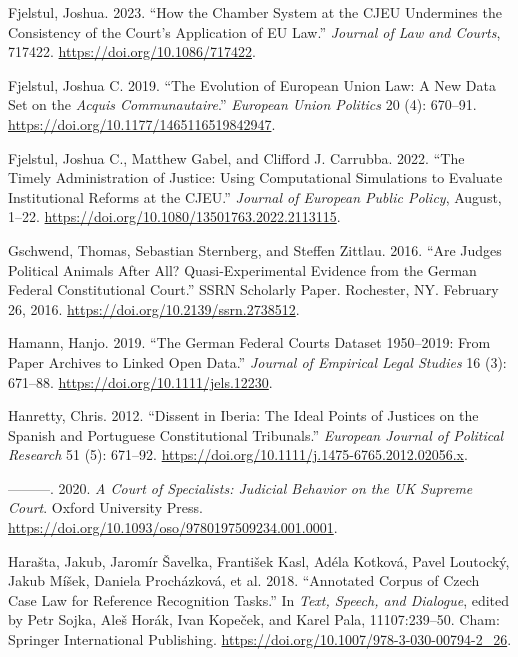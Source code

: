 \documentclass[
  11pt,
]{article}
\newlength{\cslhangindent}
\newenvironment{CSLReferences}[2] %
 {%
  \setlength{\parindent}{0pt}
  \ifodd #1 \everypar{\setlength{\hangindent}{\cslhangindent}}\ignorespaces\fi
  \ifnum #2 > 0
  \setlength{\parskip}{#2\baselineskip}
  \fi
 }%
 {}
\begin{document}
\begin{CSLReferences}{1}{0}
\leavevmode{}%
Fjelstul, Joshua. 2023. {``How the {Chamber System} at the {CJEU
Undermines} the {Consistency} of the {Court}'s {Application} of {EU
Law}.''} \emph{Journal of Law and Courts}, 717422.
\url{https://doi.org/10.1086/717422}.

\leavevmode{}%
Fjelstul, Joshua C. 2019. {``The Evolution of {European Union} Law: {A}
New Data Set on the {\emph{Acquis Communautaire}}.''} \emph{European
Union Politics} 20 (4): 670--91.
\url{https://doi.org/10.1177/1465116519842947}.

\leavevmode{}%
Fjelstul, Joshua C., Matthew Gabel, and Clifford J. Carrubba. 2022.
{``The Timely Administration of Justice: Using Computational Simulations
to Evaluate Institutional Reforms at the {CJEU}.''} \emph{Journal of
European Public Policy}, August, 1--22.
\url{https://doi.org/10.1080/13501763.2022.2113115}.

\leavevmode{}%
Gschwend, Thomas, Sebastian Sternberg, and Steffen Zittlau. 2016. {``Are
{Judges Political Animals} After {All}? {Quasi-Experimental Evidence}
from the {German Federal Constitutional Court}.''} SSRN Scholarly Paper.
{Rochester, NY}. February 26, 2016.
\url{https://doi.org/10.2139/ssrn.2738512}.

\leavevmode{}%
Hamann, Hanjo. 2019. {``The {German Federal Courts Dataset} 1950--2019:
{From Paper Archives} to {Linked Open Data}.''} \emph{Journal of
Empirical Legal Studies} 16 (3): 671--88.
\url{https://doi.org/10.1111/jels.12230}.

\leavevmode{}%
Hanretty, Chris. 2012. {``Dissent in {Iberia}: {The} Ideal Points of
Justices on the {Spanish} and {Portuguese Constitutional Tribunals}.''}
\emph{European Journal of Political Research} 51 (5): 671--92.
\url{https://doi.org/10.1111/j.1475-6765.2012.02056.x}.

\leavevmode{}%
---------. 2020. \emph{A {Court} of {Specialists}: {Judicial Behavior}
on the {UK Supreme Court}}. {Oxford University Press}.
\url{https://doi.org/10.1093/oso/9780197509234.001.0001}.

\leavevmode{}%
Harašta, Jakub, Jaromír Šavelka, František Kasl, Adéla Kotková, Pavel
Loutocký, Jakub Míšek, Daniela Procházková, et al. 2018. {``Annotated
{Corpus} of {Czech Case Law} for {Reference Recognition Tasks}.''} In
\emph{Text, {Speech}, and {Dialogue}}, edited by Petr Sojka, Aleš Horák,
Ivan Kopeček, and Karel Pala, 11107:239--50. {Cham}: {Springer
International Publishing}.
\url{https://doi.org/10.1007/978-3-030-00794-2_26}.


\end{CSLReferences}
\end{document}
